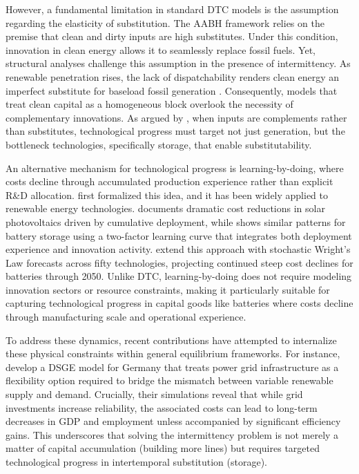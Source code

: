 \documentclass[12pt, a4paper]{article}
\begin{document}
	However, a fundamental limitation in standard DTC models is the assumption regarding the elasticity of substitution. The AABH framework relies on the premise that clean and dirty inputs are high substitutes. Under this condition, innovation in clean energy allows it to seamlessly replace fossil fuels. Yet, structural analyses challenge this assumption in the presence of intermittency. As renewable penetration rises, the lack of dispatchability renders clean energy an imperfect substitute for baseload fossil generation \citep{hirth2013, joskow2011}. Consequently, models that treat clean capital as a homogeneous block overlook the necessity of complementary innovations. As argued by \citet{hart2019}, when inputs are complements rather than substitutes, technological progress must target not just generation, but the bottleneck technologies, specifically storage, that enable substitutability.
	
	An alternative mechanism for technological progress is learning-by-doing, where costs decline through accumulated production experience rather than explicit R\&D allocation. \citet{arrow1962} first formalized this idea, and it has been widely applied to renewable energy technologies. \citet{nemet2006} documents dramatic cost reductions in solar photovoltaics driven by cumulative deployment, while \citet{kittner2017} shows similar patterns for battery storage using a two-factor learning curve that integrates both deployment experience and innovation activity. \citet{way2022} extend this approach with stochastic Wright's Law forecasts across fifty technologies, projecting continued steep cost declines for batteries through 2050. Unlike DTC, learning-by-doing does not require modeling innovation sectors or resource constraints, making it particularly suitable for capturing technological progress in capital goods like batteries where costs decline through manufacturing scale and operational experience.
	
	To address these dynamics, recent contributions have attempted to internalize these physical constraints within general equilibrium frameworks. For instance, \citet{schreiner2020investing} develop a DSGE model for Germany that treats power grid infrastructure as a flexibility option required to bridge the mismatch between variable renewable supply and demand. Crucially, their simulations reveal that while grid investments increase reliability, the associated costs can lead to long-term decreases in GDP and employment unless accompanied by significant efficiency gains. This underscores that solving the intermittency problem is not merely a matter of capital accumulation (building more lines) but requires targeted technological progress in intertemporal substitution (storage).
	
\end{document}
